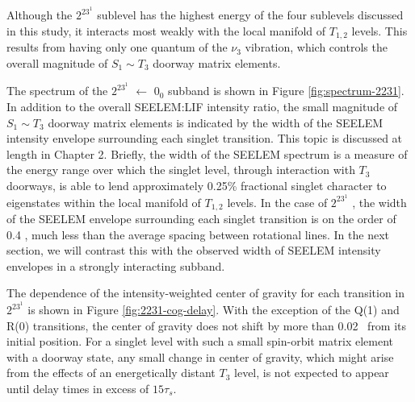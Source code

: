 Although the $2^23^1$  sublevel has the highest energy of the
four sublevels discussed in this study, it interacts most weakly with
the local manifold of $T_{1,2}$ levels.  This results from having only
one quantum of the $\nu_3$ vibration, which controls the overall
magnitude of $S_1 \sim T_3$ doorway matrix elements.

The spectrum of the $2^23^1$  $\leftarrow$ $0_0$ subband is
shown in Figure \ref{fig:spectrum-2231}.  In addition to the overall
SEELEM:LIF intensity ratio, the small magnitude of $S_1 \sim T_3$
doorway matrix elements is indicated by the width of the SEELEM
intensity envelope surrounding each singlet transition.  This topic is
discussed at length in Chapter 2.  Briefly, the width of the SEELEM
spectrum is a measure of the energy range over which the singlet
level, through interaction with $T_3$ doorways, is able to lend
approximately 0.25\% fractional singlet character to eigenstates
within the local manifold of $T_{1,2}$ levels.  In the case of
$2^23^1$ , the width of the SEELEM envelope surrounding each
singlet transition is on the order of 0.4 \rcm, much less than the
average spacing between rotational lines.  In the next section, we
will contrast this with the observed width of SEELEM intensity
envelopes in a strongly interacting subband.


The dependence of the intensity-weighted center of gravity for each
transition in $2^23^1$  is shown in Figure
\ref{fig:2231-cog-delay}.  With the exception of the Q(1) and R(0)
transitions, the center of gravity does not shift by more than 0.02
\rcm\ from its initial position.  For a singlet level with such a
small spin-orbit matrix element with a doorway state, any small change
in center of gravity, which might arise from the effects of an
energetically distant $T_3$ level, is not expected to appear until
delay times in excess of $15\tau_s$.

